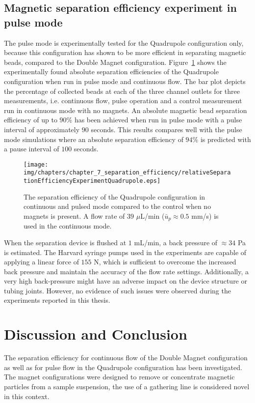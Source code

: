 \subsection{Magnetic separation efficiency experiment in pulse mode}\label{subsec:particleSeparationExperimentInPulseMode}
The pulse mode is experimentally tested for the Quadrupole configuration only, because this configuration has shown to be more efficient in separating magnetic beads, compared to the Double Magnet configuration. Figure~\ref{fig:separationEfficiencyPulseExperimentQuadrupoleConfiguration} shows the experimentally found absolute separation efficiencies of the Quadrupole configuration when run in pulse mode and continuous flow. The bar plot depicts the percentage of collected beads at each of the three channel outlets for three measurements, i.e. continuous flow, pulse operation and a control measurement run in continuous mode with no magnets. An absolute magnetic bead separation efficiency of up to $90\%$ has been achieved when run in pulse mode with a pulse interval of approximately $90$ seconds. This results compares well with the pulse mode simulations where an absolute separation efficiency of $94\%$ is predicted with a pause interval of $100$ seconds.

\begin{figure}[htb]
\centering
\texttt{[image: img/chapters/chapter\_7\_separation\_efficiency/relativeSeparationEfficiencyExperimentQuadrupole.eps]}
\caption[Particle separation efficiency of the Quadrupole configuration in pulse mode]{The separation efficiency of the Quadrupole configuration in continuous and pulsed mode compared to the control when no magnets is present. A flow rate of $39$ $\mu$L/min ($\bar{u}_{p}\approx0.5$ mm/s) is used in the continuous mode.}
\label{fig:separationEfficiencyPulseExperimentQuadrupoleConfiguration}
\end{figure}
 
When the separation device is flushed at $1$ mL/min, a back pressure of $\approx34$ Pa is estimated. The Harvard syringe pumps used in the experiments are capable of applying a linear force of $155$ N, which is sufficient to overcome the increased back pressure and maintain the accuracy of the flow rate settings. Additionally, a very high back-pressure might have an adverse impact on the device structure or tubing joints. However, no evidence of such issues were observed during the experiments reported in this thesis. 
 
\section{Discussion and Conclusion}\label{sec:discussionAndConclusionMagneticSeparation}
The separation efficiency for continuous flow of the Double Magnet configuration as well as for pulse flow in the Quadrupole configuration has been investigated. The magnet configurations were designed to remove or concentrate magnetic particles from a sample suspension, the use of a gathering line is considered novel in this context. 

